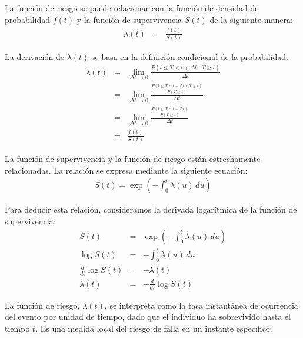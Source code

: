 \documentclass[a4paper]{report} %
\begin{document}
La funci\'on de riesgo se puede relacionar con la funci\'on de densidad de probabilidad $f(t)$ y la funci\'on de supervivencia $S(t)$ de la siguiente manera:
\begin{eqnarray*}
\lambda(t) &=& \frac{f(t)}{S(t)}
\end{eqnarray*}

La derivaci\'on de $\lambda(t)$ se basa en la definici\'on condicional de la probabilidad:
\begin{eqnarray*}
\lambda(t) &=& \lim_{\Delta t \to 0} \frac{P(t \leq T < t + \Delta t \mid T \geq t)}{\Delta t} \\
           &=& \lim_{\Delta t \to 0} \frac{\frac{P(t \leq T < t + \Delta t \text{ y } T \geq t)}{P(T \geq t)}}{\Delta t} \\
           &=& \lim_{\Delta t \to 0} \frac{\frac{P(t \leq T < t + \Delta t)}{P(T \geq t)}}{\Delta t} \\
           &=& \frac{f(t)}{S(t)}
\end{eqnarray*}


La funci\'on de supervivencia y la funci\'on de riesgo est\'an estrechamente relacionadas. La relaci\'on se expresa mediante la siguiente ecuaci\'on:
\begin{eqnarray*}
S(t) = \exp\left(-\int_0^t \lambda(u) \, du\right)
\end{eqnarray*}

Para deducir esta relaci\'on, consideramos la derivada logar\'itmica de la funci\'on de supervivencia:
\begin{eqnarray*}
S(t) &=& \exp\left(-\int_0^t \lambda(u) \, du\right) \\
\log S(t) &=& -\int_0^t \lambda(u) \, du \\
\frac{d}{dt} \log S(t) &=& -\lambda(t) \\
\lambda(t) &=& -\frac{d}{dt} \log S(t)
\end{eqnarray*}

La funci\'on de riesgo, $\lambda(t)$, se interpreta como la tasa instant\'anea de ocurrencia del evento por unidad de tiempo, dado que el individuo ha sobrevivido hasta el tiempo $t$. Es una medida local del riesgo de falla en un instante espec\'ifico.
\end{document}

